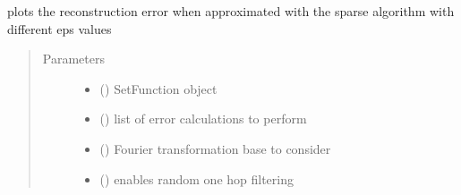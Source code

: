 \documentclass[letterpaper,10pt,english]{sphinxmanual}
\begin{document}
\begin{fulllineitems}
\label{\detokenize{setFTs:setFTs.plotting.plot_reconstruction_error}}
\sphinxAtStartPar
plots the reconstruction error when approximated with the sparse algorithm with different eps values
\begin{quote}\begin{description}
\item[{Parameters}] \leavevmode\begin{itemize}
\item {} 
\sphinxAtStartPar
{} ({\hyperref[\detokenize{setFTs:setFTs.setfunctions.SetFunction}]{}}) \textendash{} SetFunction object

\item {} 
\sphinxAtStartPar
{} (\sphinxstyleliteralemphasis{\sphinxupquote{{[}}}\sphinxstyleliteralemphasis{\sphinxupquote{{]}}}) \textendash{} list of error calculations to perform

\item {} 
\sphinxAtStartPar
{} () \textendash{} Fourier transformation base to consider

\item {} 
\sphinxAtStartPar
{} () \textendash{} enables random one hop filtering

\end{itemize}

\end{description}\end{quote}

\end{fulllineitems}

\end{document}
